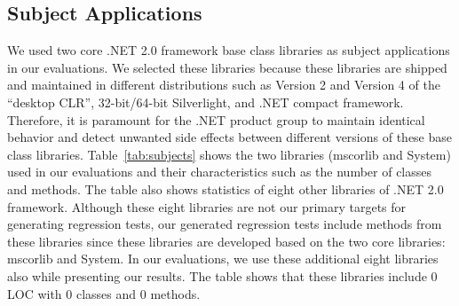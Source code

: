\subsection{Subject Applications}

We used two core .NET 2.0 framework base class libraries as subject applications in our evaluations. We selected these libraries because these libraries are shipped and maintained in different distributions such as Version 2 and Version 4 of the ``desktop CLR'', 32-bit/64-bit Silverlight, and .NET compact framework. Therefore, it is paramount for the .NET product group to maintain identical behavior and detect unwanted side effects between different versions of these base class libraries. Table~\ref{tab:subjects} shows the two libraries (mscorlib and System) used in our evaluations and their characteristics such as the number of classes and methods. The table also shows statistics of eight other libraries of .NET 2.0 framework. Although these eight libraries are not our primary targets for generating regression tests, our generated regression tests include methods from these libraries since these libraries are developed based on the two core libraries: mscorlib and System. In our evaluations, we use these additional eight libraries also while presenting our results. The table shows that these libraries include $0$ LOC with $0$ classes and $0$ methods.

